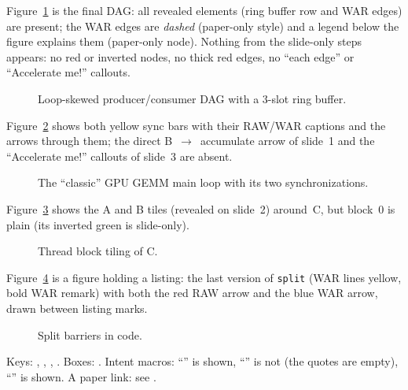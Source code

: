 \documentclass{article}
\begin{document}

Figure~\ref{fig:dag} is the final DAG: all revealed elements (ring buffer row and WAR edges)
are present; the WAR edges are \emph{dashed} (paper-only style) and a legend below the
figure explains them (paper-only node). Nothing from the slide-only steps appears:
no red or inverted nodes, no thick red edges, no ``each edge'' or ``Accelerate me!'' callouts.

\begin{figure}[ht]
\centering

\caption{Loop-skewed producer/consumer DAG with a 3-slot ring buffer.}
\label{fig:dag}
\end{figure}

Figure~\ref{fig:sync_flow} shows both yellow sync bars with their RAW/WAR captions
and the arrows through them; the direct B~$\to$~accumulate arrow of slide~1
and the ``Accelerate me!'' callouts of slide~3 are absent.

\begin{figure}[ht]
\centering

\caption{The ``classic'' GPU GEMM main loop with its two synchronizations.}
\label{fig:sync_flow}
\end{figure}

Figure~\ref{fig:grid_tile} shows the A and B tiles (revealed on slide~2) around~C,
but block~0 is plain (its inverted green is slide-only).

\begin{figure}[ht]
\centering

\caption{Thread block tiling of C.}
\label{fig:grid_tile}
\end{figure}

Figure~\ref{fig:split_marks} is a figure holding a listing: the last version of \texttt{split}
(WAR lines yellow, bold WAR remark) with both the red RAW arrow and the blue WAR arrow,
drawn between listing marks.

\begin{figure}[ht]
\centering

\caption{Split barriers in code.}
\label{fig:split_marks}
\end{figure}


Keys: , , , .
Boxes:     
. Intent macros: ``'' is shown,
``'' is not (the quotes are empty),
``'' is shown. A paper link: see .
\end{document}
